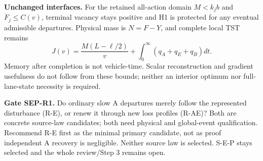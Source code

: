 \documentclass[11pt,a4paper]{article}
\begin{document}
\textbf{Unchanged interfaces.} For the retained all-action domain
$M<k_jb$ and $\dot F_j\leq C(v)$, terminal vacancy stays positive and H1
is protected for any eventual admissible departures. Physical mass is
$N=F-Y$, and complete local TST remains
\begin{equation}
 J(v)=\frac{M(L-\ell/2)}v+\int_0^\infty(q_A+q_E+q_B)dt. \tag{18}
\end{equation}
Memory after completion is not vehicle-time. Scalar reconstruction and
gradient usefulness do not follow from these bounds; neither an interior
optimum nor full-lane-state necessity is required.

\textbf{Gate SEP-R1.} Do ordinary slow A departures merely follow the
represented disturbance (R-E), or renew it through new loss profiles
(R-AE)? Both are concrete source-law candidates; both need physical and
global-event qualification. Recommend R-E first as the minimal primary
candidate, not as proof independent A recovery is negligible. Neither source
law is selected. S-E-P stays selected and the whole review/Step 3 remains open.
\end{document}
